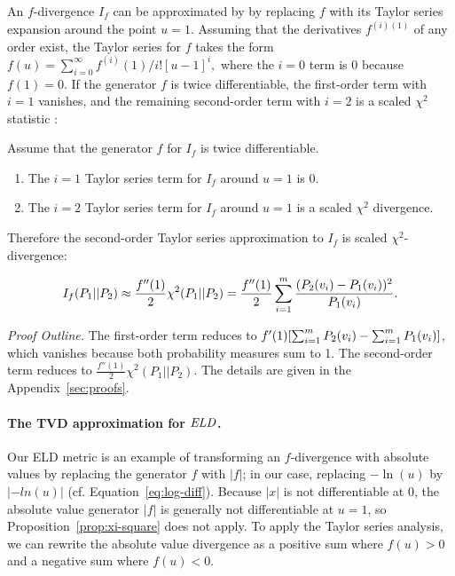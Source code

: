 {An $f$-divergence $I_{f}$ can be approximated by  by replacing $f$ with its Taylor series expansion around the point $u=1$. Assuming that the derivatives $f^{(i)(1)}$ of any order exist, the Taylor series for $f$ takes the form $f(u) = \sum_{i=0}^{\infty} f^{(i)}(1)/i! [u-1]^{i},$ where the $i=0$ term is 0 because $f(1) = 0$. If the generator $f$ is twice differentiable, the first-order term with $i=1$ vanishes, and the remaining second-order term with $i=2$ is a scaled $\chi^{2}$ statistic \cite{Nielsen2014}:

\begin{proposition} \label{prop:xi-square}
Assume that the generator $f$ for $I_{f}$ is twice differentiable.   

\begin{enumerate}
\item The $i=1$ Taylor series term for  $I_{f}$ around $u=1$ is 0.
\item The $i=2$ Taylor series term for  $I_{f}$ around $u=1$ is a scaled $\chi^{2}$ divergence.
\end{enumerate}


Therefore the second-order Taylor series approximation to $I_{f}$ is scaled $\chi^{2}$-divergence:

$$I_{f}(P_{1}||P_{2}) \approx \frac{f''(1)}{2} \chi^{2}(P_{1}||P_{2}) = \frac{f''(1)}{2} 
\sum_{i=1}^{m}  \frac{(P_{2}(v_{i})-P_{1}(v_{i}))^{2}}
 {P_{1}(v_{i})}.$$ 
\end{proposition} 
{\em Proof Outline.} 
The first-order term reduces to $f'(1) [\sum_{i=1}^{m} P_{2}(v_{i}) - \sum_{i=1}^{m} P_{1}(v_{i})]$, which vanishes because both probability measures sum to 1. The second-order term reduces to $ \frac{f''(1)}{2} \chi^{2}(P_{1}||P_{2})$. The details are given in the Appendix~\ref{sec:proofs}. 

\paragraph{The TVD approximation for $\it{ELD}$.}

Our ELD metric is an example of transforming an $f$-divergence with absolute values by replacing the generator $f$ with $|f|$; in our case, replacing $-\ln(u)$ by $|-ln(u)|$ (cf. Equation~\eqref{eq:log-diff}). Because $|x|$ is not differentiable at 0,  the absolute value generator $|f|$ is generally not differentiable at $u=1$, so Proposition~\ref{prop:xi-square} does not apply. To apply the Taylor series analysis, we can rewrite the absolute value divergence as a positive sum where $f(u)>0$ and a negative sum where $f(u) < 0$. 

}
